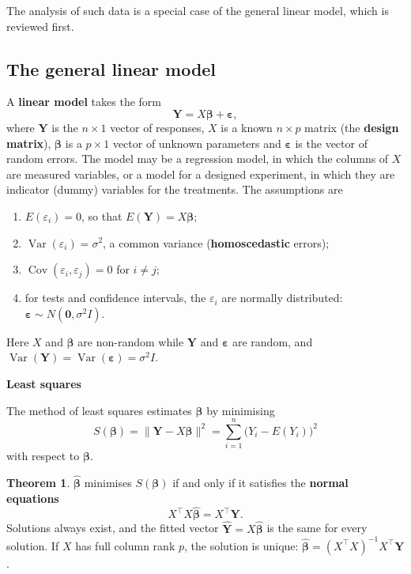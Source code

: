 \documentclass[11pt,a4paper]{article}
\numberwithin{equation}{section}
\DeclareMathOperator{\Var}{Var}
\DeclareMathOperator{\Cov}{Cov}
\theoremstyle{definition}
\newtheorem{thm}{Theorem}[subsection]
\newcommand{\subhead}[1]{%
  \par\medskip\noindent\textbf{#1}\par\nobreak\smallskip}
\begin{document}
The analysis of such data is a special case of the general linear model, which is reviewed first.

\subsection{The general linear model}
A \textbf{linear model} takes the form
\[
\mathbf Y = X\boldsymbol\beta + \boldsymbol\varepsilon ,
\]
where $\mathbf Y$ is the $n \times 1$ vector of responses, $X$ is a known $n \times p$ matrix (the \textbf{design matrix}), $\boldsymbol\beta$ is a $p \times 1$ vector of unknown parameters
and $\boldsymbol\varepsilon$ is the vector of random errors. The model may be a regression model, in which the columns of $X$ are measured variables, or a
model for a designed experiment, in which they are indicator (dummy) variables for the treatments. The assumptions are
\begin{enumerate}[label=(\roman*)]
\item $E(\varepsilon_i) = 0$, so that $E(\mathbf Y) = X\boldsymbol\beta$;
\item $\Var(\varepsilon_i) = \sigma^2$, a common variance (\textbf{homoscedastic} errors);
\item $\Cov(\varepsilon_i, \varepsilon_j) = 0$ for $i \ne j$;
\item for tests and confidence intervals, the $\varepsilon_i$ are normally distributed: $\boldsymbol\varepsilon \sim N(\mathbf 0, \sigma^2I)$.
\end{enumerate}
Here $X$ and $\boldsymbol\beta$ are non-random while $\mathbf Y$ and $\boldsymbol\varepsilon$ are random, and $\Var(\mathbf Y) = \Var(\boldsymbol\varepsilon) = \sigma^2I$.

\subhead{Least squares}
The method of least squares estimates $\boldsymbol\beta$ by minimising
\[
S(\boldsymbol\beta) = \|\mathbf Y - X\boldsymbol\beta\|^2 = \sum_{i=1}^n\bigl(Y_i - E(Y_i)\bigr)^2
\]
with respect to $\boldsymbol\beta$.

\begin{thm}\label{thm:normal-equations}
$\hat{\boldsymbol\beta}$ minimises $S(\boldsymbol\beta)$ if and only if it satisfies the \textbf{normal equations}
\[
X^\top X\hat{\boldsymbol\beta} = X^\top\mathbf Y .
\]
Solutions always exist, and the fitted vector $\hat{\mathbf Y} = X\hat{\boldsymbol\beta}$ is the same for every solution. If $X$ has full column rank $p$, the solution is unique:
$\hat{\boldsymbol\beta} = (X^\top X)^{-1}X^\top\mathbf Y$.
\end{thm}
\end{document}

